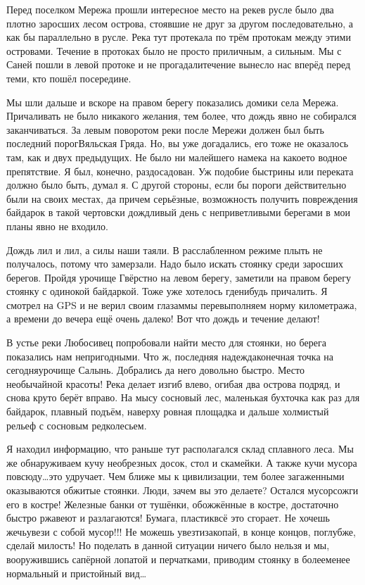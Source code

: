Перед поселком Мережа прошли интересное место на реке\mdash в русле было два плотно заросших лесом острова, стоявшие не друг за другом последовательно, а как бы параллельно в русле. Река тут протекала по трём протокам между этими островами. Течение в протоках было не просто приличным, а сильным. Мы с Саней пошли в левой протоке и не прогадали\mdash течение вынесло нас вперёд перед теми, кто пошёл посередине.

Мы шли дальше и вскоре на правом берегу показались домики села Мережа. Причаливать не было никакого желания, тем более, что дождь явно не собирался заканчиваться. За левым поворотом реки после Мережи должен был быть последний порог\mdash Вяльская Гряда. Но, вы уже догадались, его тоже не оказалось там, как и двух предыдущих. Не было ни малейшего намека на какое\sdash то водное препятствие. Я был, конечно, раздосадован. Уж подобие быстрины или переката должно было быть, думал я. С другой стороны, если бы пороги действительно были на своих местах, да причем серьёзные, возможность получить повреждения байдарок в такой чертовски дождливый день с неприветливыми берегами в мои планы явно не входило.

Дождь лил и лил, а силы наши таяли. В расслабленном режиме плыть не получалось, потому что замерзали. Надо было искать стоянку среди заросших берегов. Пройдя урочище Гвёрстно на левом берегу, заметили на правом берегу стоянку с одинокой байдаркой.  Тоже уже хотелось где\sdash нибудь причалить. Я смотрел на GPS и не верил своим глазам\mdash мы перевыполняем норму километража, а времени до вечера ещё очень далеко! Вот что дождь и течение делают! 

В устье реки Любосивец попробовали найти место для стоянки, но берега показались нам непригодными. Что ж, последняя надежда\mdash конечная точка на сегодня\mdash урочище Салынь. Добрались да него довольно быстро. Место необычайной красоты! Река делает изгиб влево, огибая два острова подряд, и снова круто берёт вправо. На мысу сосновый лес, маленькая бухточка как раз для байдарок, плавный подъём, наверху ровная площадка и дальше холмистый рельеф с сосновым редколесьем. 

Я находил информацию, что раньше тут располагался склад сплавного леса. Мы же обнаруживаем кучу необрезных досок, стол и скамейки. А также кучи мусора повсюду\ldots это удручает. Чем ближе мы к цивилизации, тем более загаженными оказываются обжитые стоянки. Люди, зачем вы это делаете? Остался мусор\mdash сожги его в костре! Железные банки от тушёнки, обожжённые в костре, достаточно быстро ржавеют и разлагаются! Бумага, пластик\mdash всё это сгорает. Не хочешь жечь\mdash увези с собой мусор!!! Не можешь увезти\mdash закопай, в конце концов, поглубже, сделай милость! Но поделать в данной ситуации ничего было нельзя и мы, вооружившись сапёрной лопатой и перчатками, приводим стоянку в более\sdash менее нормальный и пристойный вид\ldots 

